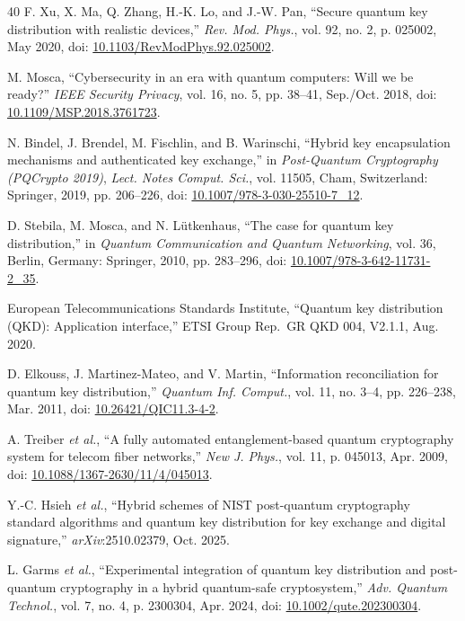 \documentclass[conference]{IEEEtran}
\begin{document}
\begin{thebibliography}{40}
F. Xu, X. Ma, Q. Zhang, H.-K. Lo, and J.-W. Pan, ``Secure quantum key distribution with realistic devices,'' \emph{Rev. Mod. Phys.}, vol. 92, no. 2, p. 025002, May 2020, doi: \href{https://doi.org/10.1103/RevModPhys.92.025002}{10.1103/RevModPhys.92.025002}.

M. Mosca, ``Cybersecurity in an era with quantum computers: Will we be ready?'' \emph{IEEE Security Privacy}, vol. 16, no. 5, pp. 38--41, Sep./Oct. 2018, doi: \href{https://doi.org/10.1109/MSP.2018.3761723}{10.1109/MSP.2018.3761723}.

N. Bindel, J. Brendel, M. Fischlin, and B. Warinschi, ``Hybrid key encapsulation mechanisms and authenticated key exchange,'' in \emph{Post-Quantum Cryptography (PQCrypto 2019)}, \emph{Lect. Notes Comput. Sci.}, vol. 11505, Cham, Switzerland: Springer, 2019, pp. 206--226, doi: \href{https://doi.org/10.1007/978-3-030-25510-7_12}{10.1007/978-3-030-25510-7\_12}.

D. Stebila, M. Mosca, and N. L\"utkenhaus, ``The case for quantum key distribution,'' in \emph{Quantum Communication and Quantum Networking}, vol. 36, Berlin, Germany: Springer, 2010, pp. 283--296, doi: \href{https://doi.org/10.1007/978-3-642-11731-2_35}{10.1007/978-3-642-11731-2\_35}.

European Telecommunications Standards Institute, ``Quantum key distribution (QKD): Application interface,'' ETSI Group Rep.\ GR QKD 004, V2.1.1, Aug. 2020.

D. Elkouss, J. Martinez-Mateo, and V. Martin, ``Information reconciliation for quantum key distribution,'' \emph{Quantum Inf. Comput.}, vol. 11, no. 3--4, pp. 226--238, Mar. 2011, doi: \href{https://doi.org/10.26421/QIC11.3-4-2}{10.26421/QIC11.3-4-2}.

A. Treiber \emph{et al.}, ``A fully automated entanglement-based quantum cryptography system for telecom fiber networks,'' \emph{New J. Phys.}, vol. 11, p. 045013, Apr. 2009, doi: \href{https://doi.org/10.1088/1367-2630/11/4/045013}{10.1088/1367-2630/11/4/045013}.

Y.-C. Hsieh \emph{et al.}, ``Hybrid schemes of NIST post-quantum cryptography standard algorithms and quantum key distribution for key exchange and digital signature,'' \emph{arXiv}:2510.02379, Oct. 2025.

L. Garms \emph{et al.}, ``Experimental integration of quantum key distribution and post-quantum cryptography in a hybrid quantum-safe cryptosystem,'' \emph{Adv. Quantum Technol.}, vol. 7, no. 4, p. 2300304, Apr. 2024, doi: \href{https://doi.org/10.1002/qute.202300304}{10.1002/qute.202300304}.


\end{thebibliography}
\end{document}
